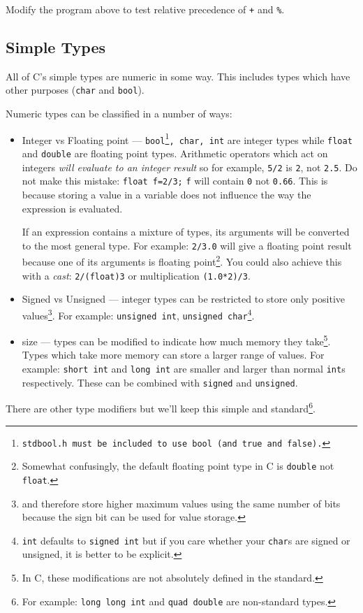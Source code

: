 \begin{exercise}
Modify the program above to test relative precedence of \texttt{+} and \texttt{\%}.
\end{exercise}


\subsection{Simple Types}\label{sec:types}
All of C's simple types are numeric in some way.
This includes types which have other purposes (\texttt{char} and \texttt{bool}).

Numeric types can be classified in a number of ways:
\begin{itemize}
 \item Integer vs Floating point --- \texttt{bool\footnote{\texttt{stdbool.h} must be included to use \texttt{bool} (and \texttt{true} and \texttt{false}).}, char, int} are integer types while \texttt{float} and \texttt{double} are floating point types.
Arithmetic operators which act on integers \emph{will evaluate to an integer result} so for example, \texttt{5/2} is \texttt{2}, not \texttt{2.5}.
Do not make this mistake:
\texttt{float f=2/3;}
\texttt{f} will contain \texttt{0} not \texttt{0.66}.
This is because storing a value in a variable does not influence the way the expression is evaluated.

If an expression contains a mixture of types, its arguments will be converted to the most general type.
For example:
\texttt{2/3.0} will give a floating point result because one of its arguments is floating point\footnote{Somewhat confusingly, the default floating point type in C is \texttt{double} not \texttt{float}.}.
You could also achieve this with a \emph{cast}: \texttt{2/(float)3} or multiplication \texttt{(1.0*2)/3}.

 \item Signed vs Unsigned --- integer types can be restricted to store only positive values\footnote{and therefore store higher maximum values using the same number of bits because the sign bit can be used for value storage.}.
 For example: \texttt{unsigned int}, \texttt{unsigned char}\footnote{\texttt{int} defaults to \texttt{signed int} but if you care whether your \texttt{char}s are signed or unsigned, it is better to be explicit.}.
 
 \item size --- types can be modified to indicate how much memory they take\footnote{In C, these modifications are not absolutely defined in the standard.}. 
 Types which take more memory can store a larger range of values.
 For example:  \texttt{short int} and \texttt{long int} are smaller and larger than normal \texttt{int}s respectively.
 These can be combined with \texttt{signed} and \texttt{unsigned}.
\end{itemize}
There are other type modifiers but we'll keep this simple and standard\footnote{For example: \texttt{long long int}  and \texttt{quad double} are non-standard types.}.


